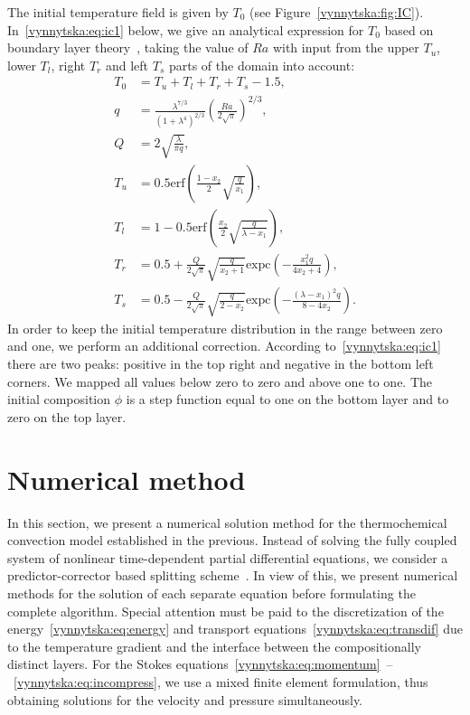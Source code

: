 The initial temperature field is given by $T_0$ (see
Figure~\ref{vynnytska:fig:IC}).  In~\eqref{vynnytska:eq:ic1} below, we
give an analytical expression for $T_0$ based on boundary layer
theory~\citep{KekenEtAl1997}, taking the value of $Ra$ with input from
the upper $T_u$, lower $T_l$, right $T_r$ and left $T_s$ parts of the
domain into account:
\begin{subequations}
  \label{vynnytska:eq:ic1}
  \begin{align}
    T_0 &= T_u + T_l + T_r + T_s - 1.5, \\
    q &= \frac{\lambda^{7/3}}{\left(1 + \lambda^4 \right)^{2/3}} \left( \frac{Ra}{2 \sqrt{\pi}}\right)^{2/3}, \\ Q & = 2\sqrt{\frac{\lambda}{\pi q}},   \\
    T_u &= 0.5 \mathrm{erf} \left( \frac{1-x_2}{2} \sqrt{\frac{q}{x_1}  } \right), \\
    T_l &= 1 - 0.5 \mathrm{erf} \left( \frac{x_2}{2} \sqrt{\frac{q}{\lambda - x_1}  } \right), \\
    T_r &= 0.5 + \frac{Q}{2\sqrt{\pi}} \sqrt{\frac{q}{x_{2} + 1} } \mathrm{expc} \left( - \frac{x_1^2 q}{4 x_2 + 4} \right), \\
    T_s &= 0.5 - \frac{Q}{2\sqrt{\pi}} \sqrt{\frac{q}{2 - x_{2}} } \mathrm{expc} \left( - \frac{ \left(\lambda - x_1 \right)^2  q}{8 - 4 x_2} \right).
  \end{align}
\end{subequations}
In order to keep the initial temperature distribution in the range
between zero and one, we perform an additional correction. According
to~\eqref{vynnytska:eq:ic1} there are two peaks: positive in the top
right and negative in the bottom left corners. We mapped all values
below zero to zero and above one to one. The initial composition
$\phi$ is a step function equal to one on the bottom layer and to zero
on the top layer.


\section{Numerical method}

In this section, we present a numerical solution method for the
thermochemical convection model established in the previous. Instead
of solving the fully coupled system of nonlinear time-dependent
partial differential equations, we consider a predictor-corrector
based splitting scheme~\citep{BergKekenYuen1993, HansenEbel1988}. In
view of this, we present numerical methods for the solution of each
separate equation before formulating the complete algorithm. Special
attention must be paid to the discretization of the
energy~\eqref{vynnytska:eq:energy} and transport
equations~\eqref{vynnytska:eq:transdif} due to the temperature
gradient and the interface between the compositionally distinct
layers. For the Stokes
equations~\eqref{vynnytska:eq:momentum}~--~\eqref{vynnytska:eq:incompress},
we use a mixed finite element formulation, thus obtaining solutions
for the velocity and pressure simultaneously.

